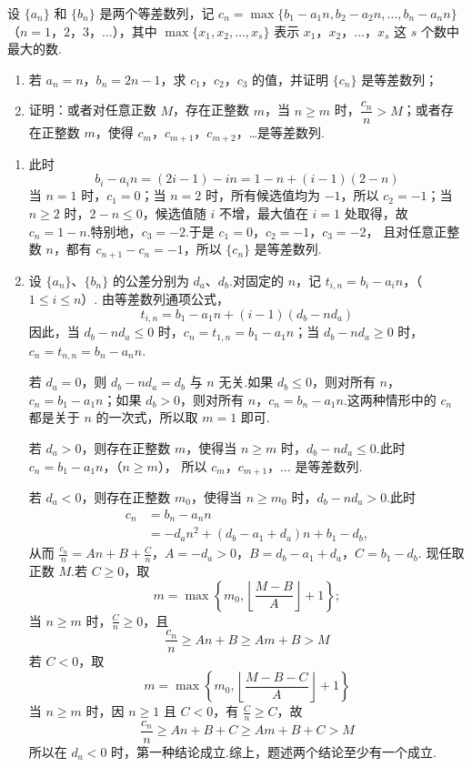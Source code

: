 \begin{problem}
设 \(\{a_n\}\) 和 \(\{b_n\}\) 是两个等差数列，记 \(c_n=\max\{b_1-a_1n,b_2-a_2n,\dots,b_n-a_nn\}\)（\(n=1\)，\(2\)，\(3\)，\(\dots\)），其中 \(\max\{x_1,x_2,\dots,x_s\}\) 表示 \(x_1\)，\(x_2\)，\(\dots\)，\(x_s\) 这 \(s\) 个数中最大的数.

\begin{enumerate}
\item 若 \(a_n=n\)，\(b_n=2n-1\)，求 \(c_1\)，\(c_2\)，\(c_3\) 的值，并证明 \(\{c_n\}\) 是等差数列；
\item 证明：或者对任意正数 \(M\)，存在正整数 \(m\)，当 \(n\ge m\) 时，\(\dfrac{c_n}{n}>M\)；或者存在正整数 \(m\)，使得 \(c_m\)，\(c_{m+1}\)，\(c_{m+2}\)，\dots 是等差数列.
\end{enumerate}
\end{problem}

\begin{solution}
\begin{enumerate}
\item 此时
\[
b_i-a_in=(2i-1)-in=1-n+(i-1)(2-n)
\]
当 \(n=1\) 时，\(c_1=0\)；当 \(n=2\) 时，所有候选值均为 \(-1\)，所以 \(c_2=-1\)；当 \(n\ge2\) 时，\(2-n\le0\)，候选值随 \(i\) 不增，最大值在 \(i=1\) 处取得，故 \(c_n=1-n\).特别地，\(c_3=-2\).于是
\(c_1=0\)，\(c_2=-1\)，\(c_3=-2\)，
且对任意正整数 \(n\)，都有 \(c_{n+1}-c_n=-1\)，所以 \(\{c_n\}\) 是等差数列.

\item 设 \(\{a_n\}\)、\(\{b_n\}\) 的公差分别为 \(d_a\)、\(d_b\).对固定的 \(n\)，记
\(t_{i,n}=b_i-a_in\)，（\(1\le i\le n\)）.
由等差数列通项公式，
\[
t_{i,n}=b_1-a_1n+(i-1)(d_b-nd_a)
\]
因此，当 \(d_b-nd_a\le0\) 时，\(c_n=t_{1,n}=b_1-a_1n\)；当 \(d_b-nd_a\ge0\) 时，\(c_n=t_{n,n}=b_n-a_nn\).

若 \(d_a=0\)，则 \(d_b-nd_a=d_b\) 与 \(n\) 无关.如果 \(d_b\le0\)，则对所有 \(n\)，\(c_n=b_1-a_1n\)；如果 \(d_b>0\)，则对所有 \(n\)，\(c_n=b_n-a_1n\).这两种情形中的 \(c_n\) 都是关于 \(n\) 的一次式，所以取 \(m=1\) 即可.

若 \(d_a>0\)，则存在正整数 \(m\)，使得当 \(n\ge m\) 时，\(d_b-nd_a\le0\).此时
\(c_n=b_1-a_1n\)，（\(n\ge m\)），
所以 \(c_m\)，\(c_{m+1}\)，\(\dots\) 是等差数列.

若 \(d_a<0\)，则存在正整数 \(m_0\)，使得当 \(n\ge m_0\) 时，\(d_b-nd_a>0\).此时
\[
\begin{aligned}
c_n&=b_n-a_nn\\
&=-d_an^2+(d_b-a_1+d_a)n+b_1-d_b,
\end{aligned}
\]
从而
\(\frac{c_n}{n}=An+B+\frac{C}{n}\)，\(A=-d_a>0\)，\(B=d_b-a_1+d_a\)，\(C=b_1-d_b\).
现任取正数 \(M\).若 \(C\ge0\)，取
\[
m=\max\left\{m_0,\left\lfloor\frac{M-B}{A}\right\rfloor+1\right\};
\]
当 \(n\ge m\) 时，\(\frac{C}{n}\ge0\)，且
\[
\frac{c_n}{n}\ge An+B\ge Am+B>M
\]
若 \(C<0\)，取
\[
m=\max\left\{m_0,\left\lfloor\frac{M-B-C}{A}\right\rfloor+1\right\}
\]
当 \(n\ge m\) 时，因 \(n\ge1\) 且 \(C<0\)，有 \(\frac{C}{n}\ge C\)，故
\[
\frac{c_n}{n}\ge An+B+C\ge Am+B+C>M
\]
所以在 \(d_a<0\) 时，第一种结论成立.综上，题述两个结论至少有一个成立.
\end{enumerate}
\end{solution}
